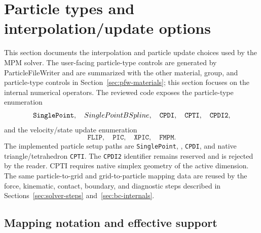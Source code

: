 \section{Particle types and interpolation/update options}
\label{sec:particle-types-and-mapping}

This section documents the interpolation and particle update choices used by the MPM solver.  The user-facing particle-type controls are generated by ParticleFileWriter and are summarized with the other material, group, and particle-type controls in Section~\ref{sec:pfw-materials}; this section focuses on the internal numerical operators.  The reviewed code exposes the particle-type enumeration
\begin{equation}
  \texttt{SinglePoint},\quad
  SinglePointBSpline,\quad
  \texttt{CPDI},\quad
  \texttt{CPTI},\quad
  \texttt{CPDI2},
\end{equation}
and the velocity/state update enumeration
\begin{equation}
  \texttt{FLIP},\quad \texttt{PIC},\quad \texttt{XPIC},\quad \texttt{FMPM}.
\end{equation}
The implemented particle setup paths are \texttt{SinglePoint}, , \texttt{CPDI}, and native triangle/tetrahedron \texttt{CPTI}. The \texttt{CPDI2} identifier remains reserved and is rejected by the reader. CPTI requires native simplex geometry of the active dimension.  The same particle-to-grid and grid-to-particle mapping data are reused by the force, kinematic, contact, boundary, and diagnostic steps described in Sections~\ref{sec:solver-steps} and~\ref{sec:bc-internals}.

\subsection{Mapping notation and effective support}
\label{subsec:mapping-notation}

